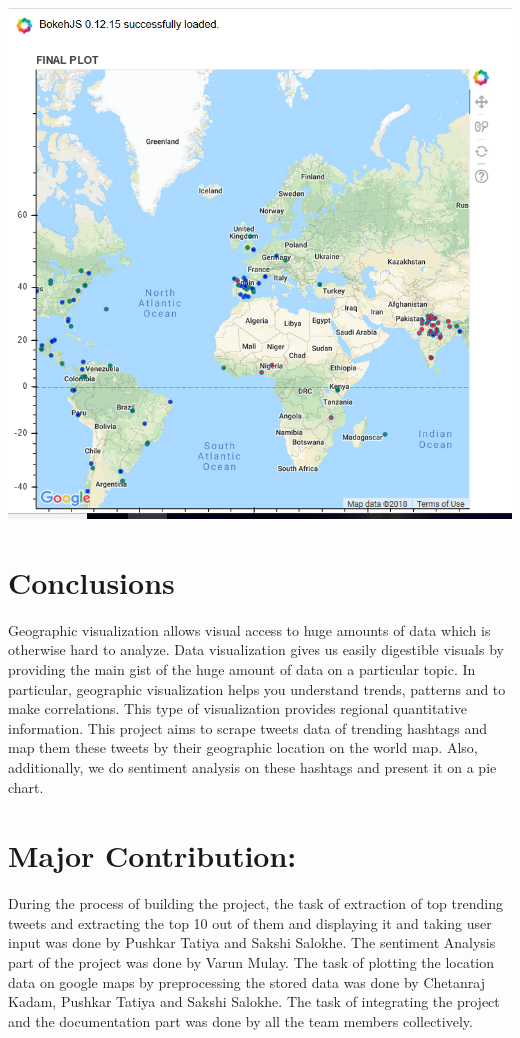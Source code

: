 \documentclass[12pt]{article}
\begin{document}
\includegraphics{Output_3.PNG} \\ [2cm]

\section{Conclusions}
Geographic visualization allows visual access to huge amounts of data which is otherwise hard to analyze. Data visualization gives us easily digestible visuals by
providing the main gist of the huge amount of data on a particular topic.
In particular, geographic visualization helps you understand trends, patterns and to make correlations. This type of visualization provides regional quantitative information.
This project aims to scrape tweets data of trending hashtags
and map them these tweets by their geographic location on the
world map. Also, additionally, we do sentiment analysis on these
hashtags and present it on a pie chart.

\newpage
\section{Major Contribution:}
During the process of building the project, the task of extraction of top trending tweets and extracting the top 10 out of them and displaying it and taking user input was done by Pushkar Tatiya and Sakshi Salokhe. The sentiment Analysis part of the project was done by Varun Mulay. The task of plotting the location data on google maps by preprocessing the stored data was done by Chetanraj Kadam, Pushkar Tatiya and Sakshi Salokhe.
The task of integrating the project and the documentation part was done by all the team members collectively.
\end{document}
